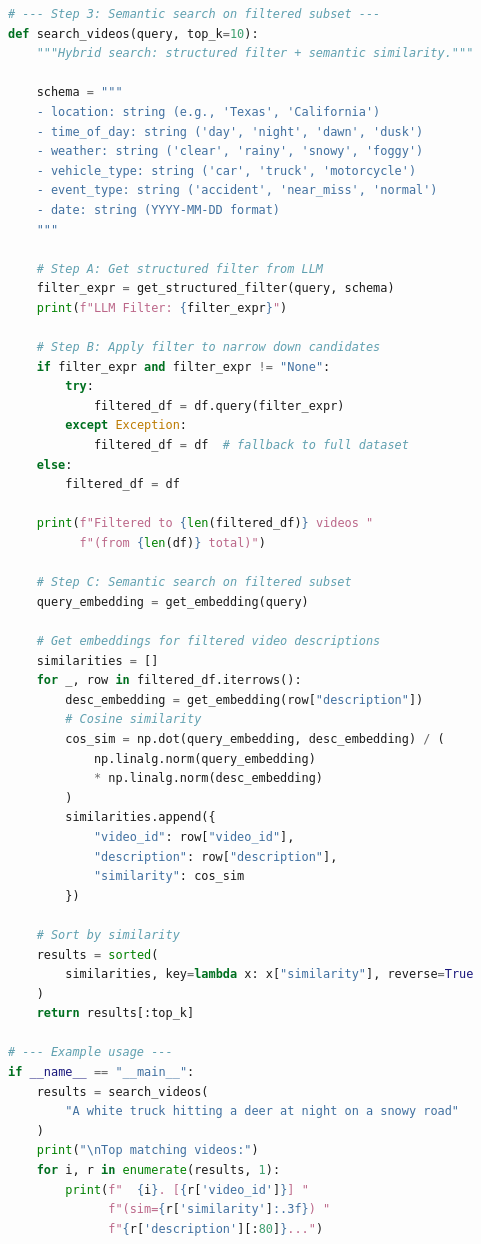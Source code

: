 \documentclass[11pt,a4paper]{article}
\begin{document}
\begin{lstlisting}[language=Python, caption={Motive Video Search --- Hybrid Approach}]
# --- Step 3: Semantic search on filtered subset ---
def search_videos(query, top_k=10):
    """Hybrid search: structured filter + semantic similarity."""

    schema = """
    - location: string (e.g., 'Texas', 'California')
    - time_of_day: string ('day', 'night', 'dawn', 'dusk')
    - weather: string ('clear', 'rainy', 'snowy', 'foggy')
    - vehicle_type: string ('car', 'truck', 'motorcycle')
    - event_type: string ('accident', 'near_miss', 'normal')
    - date: string (YYYY-MM-DD format)
    """

    # Step A: Get structured filter from LLM
    filter_expr = get_structured_filter(query, schema)
    print(f"LLM Filter: {filter_expr}")

    # Step B: Apply filter to narrow down candidates
    if filter_expr and filter_expr != "None":
        try:
            filtered_df = df.query(filter_expr)
        except Exception:
            filtered_df = df  # fallback to full dataset
    else:
        filtered_df = df

    print(f"Filtered to {len(filtered_df)} videos "
          f"(from {len(df)} total)")

    # Step C: Semantic search on filtered subset
    query_embedding = get_embedding(query)

    # Get embeddings for filtered video descriptions
    similarities = []
    for _, row in filtered_df.iterrows():
        desc_embedding = get_embedding(row["description"])
        # Cosine similarity
        cos_sim = np.dot(query_embedding, desc_embedding) / (
            np.linalg.norm(query_embedding)
            * np.linalg.norm(desc_embedding)
        )
        similarities.append({
            "video_id": row["video_id"],
            "description": row["description"],
            "similarity": cos_sim
        })

    # Sort by similarity
    results = sorted(
        similarities, key=lambda x: x["similarity"], reverse=True
    )
    return results[:top_k]

# --- Example usage ---
if __name__ == "__main__":
    results = search_videos(
        "A white truck hitting a deer at night on a snowy road"
    )
    print("\nTop matching videos:")
    for i, r in enumerate(results, 1):
        print(f"  {i}. [{r['video_id']}] "
              f"(sim={r['similarity']:.3f}) "
              f"{r['description'][:80]}...")
\end{lstlisting}
\end{document}
